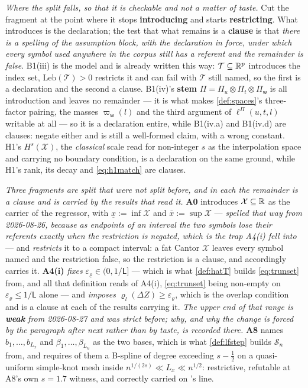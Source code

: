 \emph{Where the split falls, so that it is checkable and not a matter of taste.} Cut the fragment at the
point where it stops \textbf{introducing} and starts \textbf{restricting}. What introduces is the
declaration; the test that what remains is a \textbf{clause} is that \emph{there is a spelling of the
assumption block, with the declaration in force, under which every symbol used anywhere in the corpus
still has a referent and the remainder is false}. B1(iii) is the model and is already written this way:
$\mathcal T\subseteq\mathbb{R}^{p}$ introduces the index set, $\mathrm{Leb}(\mathcal T)>0$ restricts it and can
fail with $\mathcal T$ still named, so the first is a declaration and the second a clause. B1(iv)'s
\textbf{stem} $\Pi=\Pi_u\otimes\Pi_t\otimes\Pi_{\mathsf w}$ is all introduction and leaves no remainder
--- it is what makes \cref{def:spaces}'s three-factor pairing, the masses $\varpi_{\mathsf w}(l)$ and the
third argument of $\ell^\Pi(u,t,l)$ writable at all --- so it is a declaration entire, while B1(iv.a) and
B1(iv.d) are clauses: negate either and  is still a well-formed claim,
with a wrong constant. H1's $H^{s}(\mathcal X)$, the \emph{classical} scale read for non-integer $s$ as
the interpolation space and carrying no boundary condition, is a declaration on the same ground, while
H1's rank, its decay and \eqref{eq:h1match} are clauses.

\emph{Three fragments are split that were not split before, and in each the remainder is a clause
and is carried by the results that read it.}
\textbf{A0} introduces $\mathcal X\subseteq\mathbb{R}$ as the carrier of the regressor, with
$\underline x:=\inf\mathcal X$ and $\bar x:=\sup\mathcal X$ --- \emph{spelled that way from 2026-08-26,
because as endpoints of an interval the two symbols lose their referents exactly when the restriction is
negated, which is the trap A4(i) fell into} --- and \emph{restricts} it to a compact
interval: a fat Cantor $\mathcal X$ leaves every symbol named and the restriction false, so the
restriction is a clause, and  accordingly carries it. \textbf{A4(i)} \emph{fixes}
$\varepsilon_\varrho\in(0,1/\mathsf L]$ --- which is what \cref{def:hatT} builds \eqref{eq:trunset} from,
and all that definition reads of A4(i), \eqref{eq:trunset} being non-empty on
$\varepsilon_\varrho\le1/\mathsf L$ alone --- and \emph{imposes}
$\varrho_l(\Delta Z)\ge\varepsilon_\varrho$, which is the overlap condition and is a clause at each of
the results carrying it. \emph{The upper end of that range is \textbf{weak} from 2026-08-27 and was
strict before; why, and why the change is forced by the paragraph after next rather than by taste, is
recorded there.} \textbf{A8} names
$b_1,\dots,b_{L_x}$ and $\beta_1,\dots,\beta_{L_u}$ as the two bases, which is what \cref{def:lfstep}
builds $\mathcal S_n$ from, and requires of them a B-spline of degree exceeding $s-\tfrac12$ on a
quasi-uniform simple-knot mesh inside $n^{1/(2s)}\ll L_x\ll n^{1/2}$: restrictive, refutable at A8's own
$s=1.7$ witness, and correctly carried on 's line.

